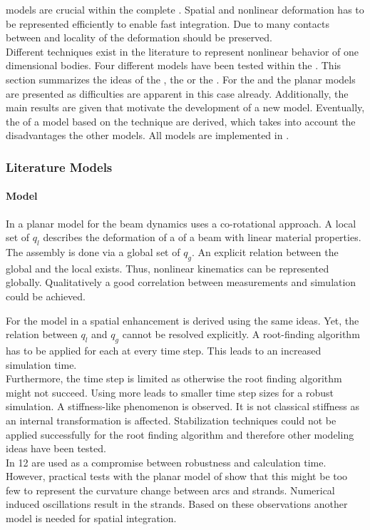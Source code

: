 \Ring models are crucial within the complete \CVT.
Spatial and nonlinear deformation has to be represented efficiently to enable fast integration.
Due to many contacts between \els and \rings locality of the deformation should be preserved.\\
Different techniques exist in the literature to represent nonlinear behavior of one dimensional bodies.
Four different models have been tested within the \CVT.
This section summarizes the ideas of the \RCM, the \LRVM or the \ANCF.
For the \LRVM and the \ANCF planar models are presented as difficulties are apparent in this case already.
Additionally, the main results are given that motivate the development of a new model.
Eventually, the \EOMs of a model based on the \ALE technique are derived, which takes into account the disadvantages the other models.
All models are implemented in \MBSim \cite{forg_mbsim_2015}.

\subsubsection{Literature Models}

\paragraph{\RCM Model}
In \cite{geier_dynamics_2007} a planar model for the beam dynamics uses a co-rotational approach.
A local set of \DOFs $q_{l}$ describes the deformation of a \FE of a beam with linear material properties.
The assembly is done via a global set of \DOFs $q_{g}$.
An explicit relation between the global and the local \DOFs exists.
Thus, nonlinear kinematics can be represented globally.
Qualitatively a good correlation between measurements and simulation could be achieved.\par
%
For the model in \cite{schindler_spatial_2010} a spatial enhancement is derived using the same ideas.
Yet, the relation between $q_{l}$ and $q_{g}$ cannot be resolved explicitly.
A root-finding algorithm has to be applied for each \FE at every time step.
This leads to an increased simulation time.\\
Furthermore, the time step is limited as otherwise the root finding algorithm might not succeed.
Using more \FEs leads to smaller time step sizes for a robust simulation.
A stiffness-like phenomenon is observed.
It is not classical stiffness as an internal transformation is affected.
Stabilization techniques could not be applied successfully for the root finding algorithm and therefore other modeling ideas have been tested.\\
In \cite{schindler_spatial_2010} 12 \FEs are used as a compromise between robustness and calculation time.
However, practical tests with the planar model of \cite{geier_dynamics_2007} show that this might be too few \FEs to represent the curvature change between arcs and strands.
Numerical induced oscillations result in the strands.
Based on these observations another \ring model is needed for spatial integration.


